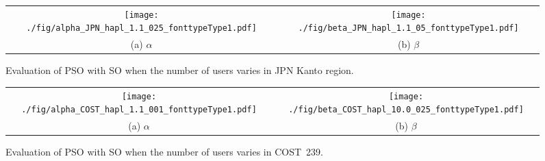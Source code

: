 \documentclass[conference]{IEEEtran}
\begin{document}
\begin{CJK}{UTF8}{ipxm}
\begin{figure}[tb]
  \begin{center}
      \begin{tabular}{cc}
      \texttt{[image: ./fig/alpha\_JPN\_hapl\_1.1\_025\_fonttypeType1.pdf]} &
      \texttt{[image: ./fig/beta\_JPN\_hapl\_1.1\_05\_fonttypeType1.pdf]} \\
      (a) $\alpha$ & (b) $\beta$
      \end{tabular}
  \end{center}
      \vspace{-0.3cm}
  \caption{Evaluation of PSO with SO when the number of users varies in JPN Kanto region.}
  \label{fig:OSA_alpha_beta_JPN}
\end{figure}

\begin{figure}[t]
  \begin{center}
      \begin{tabular}{cc}
      \texttt{[image: ./fig/alpha\_COST\_hapl\_1.1\_001\_fonttypeType1.pdf]} &
      \texttt{[image: ./fig/beta\_COST\_hapl\_10.0\_025\_fonttypeType1.pdf]} \\
      (a) $\alpha$ & (b) $\beta$
      \end{tabular}
  \end{center}
      \vspace{-0.3cm}
  \caption{Evaluation of PSO with SO when the number of users varies in COST~239.}
  \label{fig:OSA_alpha_beta_COST}
\end{figure}


\end{CJK}
\end{document}
